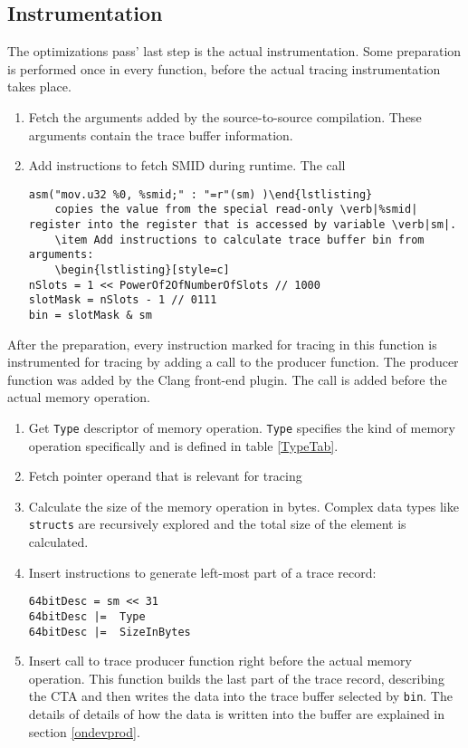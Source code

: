 \subsection{Instrumentation}\label{instru}
The optimizations pass' last step is the actual instrumentation. Some preparation is performed once in every function, before the actual tracing instrumentation takes place.
\begin{enumerate}
	\item Fetch the arguments added by the source-to-source compilation. These arguments contain the trace buffer information.
	\item Add instructions to fetch SMID during runtime. The call 
		\begin{lstlisting}[style=c]
asm("mov.u32 %0, %smid;" : "=r"(sm) )\end{lstlisting}
	copies the value from the special read-only \verb|%smid| register into the register that is accessed by variable \verb|sm|.
	\item Add instructions to calculate trace buffer bin from arguments:
	\begin{lstlisting}[style=c]
nSlots = 1 << PowerOf2OfNumberOfSlots // 1000
slotMask = nSlots - 1 // 0111
bin = slotMask & sm\end{lstlisting}
\end{enumerate}
After the preparation, every instruction marked for tracing in this function is instrumented for tracing by adding a call to the producer function. The producer function was added by the Clang front-end plugin. The call is added before the actual memory operation.
\begin{enumerate}
	\item Get  \verb|Type| descriptor of memory operation. 	\verb|Type| specifies the kind of memory operation specifically and is defined in table \ref{TypeTab}.
	\item Fetch pointer operand that is relevant for tracing
	\item Calculate the size of the memory operation in bytes. Complex data types like \verb|structs| are recursively explored and the total size of the element is calculated.
	\item Insert instructions to generate left-most part of a trace record:
		\begin{lstlisting}[style=c]
64bitDesc = sm << 31
64bitDesc |=  Type
64bitDesc |=  SizeInBytes\end{lstlisting}

	\item Insert call to trace producer function right before the actual memory operation. This function builds the
	last part of the trace record, describing the CTA and then writes the data into the trace buffer selected by \verb|bin|. The details of details of how the data is written into the buffer are explained in section \ref{ondevprod}.
\end{enumerate}

